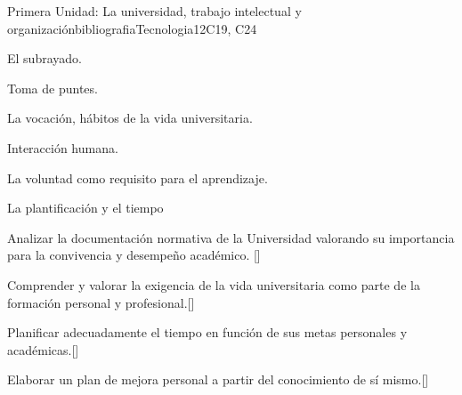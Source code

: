 \begin{syllabus}
\begin{unit}{}{Primera Unidad: La universidad, trabajo intelectual y organización}{bibliografiaTecnologia}{12}{C19, C24}
\begin{topics}
        \item El subrayado.
        \item Toma de puntes.
        \item La vocación, hábitos de la vida universitaria.
        \item Interacción humana.
        \item La voluntad como requisito para el aprendizaje.
        \item La plantificación y el tiempo
\end{topics}
\begin{learningoutcomes}
        \item Analizar la documentación normativa de la Universidad valorando su importancia para la  convivencia y desempeño académico. [\Usage]
        \item Comprender y valorar la exigencia de la vida universitaria como parte de la formación personal y profesional.[\Usage]
        \item Planificar adecuadamente el tiempo  en función de sus metas personales y académicas.[\Usage]
        \item Elaborar un plan de mejora personal a partir del conocimiento de sí mismo.[\Usage]
\end{learningoutcomes}
\end{unit}


\end{syllabus}
